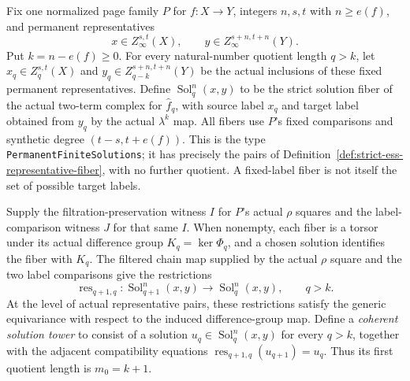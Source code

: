 \begin{definition}
  \label{def:synthetic-ess-solution-tower}
  \leanok
  Fix one normalized page family $P$ for $f:X\to Y$, integers $n,s,t$
  with $n\ge e(f)$, and permanent representatives
  \[
    x\in Z_\infty^{s,t}(X),\qquad
    y\in Z_\infty^{s+n,t+n}(Y).
  \]
  Put $k=n-e(f)\ge0$.  For every natural-number quotient length $q>k$, let
  $x_q\in Z_q^{s,t}(X)$ and $y_q\in Z_{q-k}^{s+n,t+n}(Y)$ be the
  actual inclusions of these fixed permanent representatives.  Define
  $\operatorname{Sol}_q^n(x,y)$ to be the strict solution fiber of the
  actual two-term complex for $\widehat f_q$, with source label $x_q$
  and target label obtained from $y_q$ by the actual $\lambda^k$ map.
  All fibers use $P$'s fixed comparisons and synthetic degree
  $(t-s,t+e(f))$.  This is the type
  \texttt{PermanentFiniteSolutions}; it has precisely the pairs of
  Definition~\ref{def:strict-ess-representative-fiber}, with no further
  quotient.  A fixed-label fiber is not itself the set of possible target
  labels.

  Supply the filtration-preservation witness $I$ for $P$'s actual $\rho$
  squares and the label-comparison witness $J$ for that same $I$.
  When nonempty, each fiber is a torsor under its actual difference group
  $K_q=\ker\Phi_q$, and a chosen solution identifies the fiber with $K_q$.
  The filtered chain map supplied by the actual $\rho$ square and the two
  label comparisons give the restrictions
  \[
    \operatorname{res}_{q+1,q}:\operatorname{Sol}_{q+1}^n(x,y)
      \longrightarrow\operatorname{Sol}_q^n(x,y),\qquad q>k.
  \]
  At the level of actual representative pairs, these restrictions satisfy
  the generic equivariance with respect to the induced difference-group map.
  Define a \emph{coherent solution tower} to consist of a solution
  $u_q\in\operatorname{Sol}_q^n(x,y)$ for every $q>k$, together with
  the adjacent compatibility equations
  $\operatorname{res}_{q+1,q}(u_{q+1})=u_q$.  Thus its first quotient
  length is $m_0=k+1$.


\end{definition}
